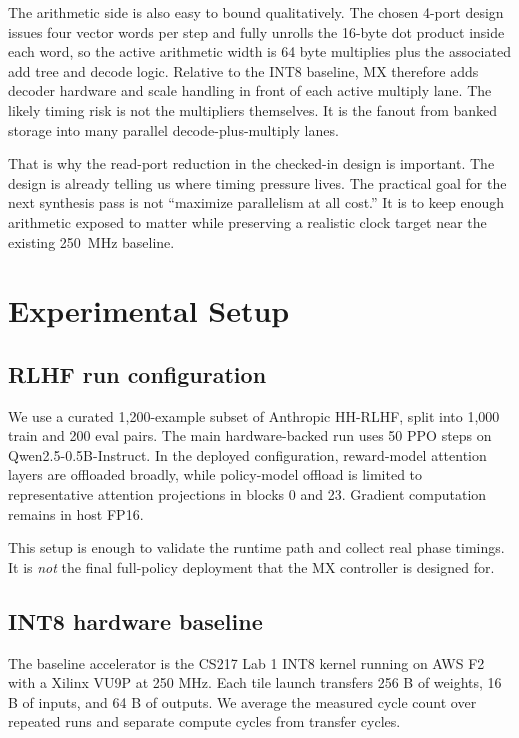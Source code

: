 \documentclass[11pt,a4paper]{article}
\begin{document}
The arithmetic side is also easy to bound qualitatively. The chosen 4-port design issues four vector words per step and fully unrolls the 16-byte dot product inside each word, so the active arithmetic width is 64 byte multiplies plus the associated add tree and decode logic. Relative to the INT8 baseline, MX therefore adds decoder hardware and scale handling in front of each active multiply lane. The likely timing risk is not the multipliers themselves. It is the fanout from banked storage into many parallel decode-plus-multiply lanes.

That is why the read-port reduction in the checked-in design is important. The design is already telling us where timing pressure lives. The practical goal for the next synthesis pass is not ``maximize parallelism at all cost.'' It is to keep enough arithmetic exposed to matter while preserving a realistic clock target near the existing 250~MHz baseline.


\section{Experimental Setup}

\subsection{RLHF run configuration}

We use a curated 1,200-example subset of Anthropic HH-RLHF, split into 1,000 train and 200 eval pairs. The main hardware-backed run uses 50 PPO steps on Qwen2.5-0.5B-Instruct. In the deployed configuration, reward-model attention layers are offloaded broadly, while policy-model offload is limited to representative attention projections in blocks 0 and 23. Gradient computation remains in host FP16.

This setup is enough to validate the runtime path and collect real phase timings. It is \emph{not} the final full-policy deployment that the MX controller is designed for.

\subsection{INT8 hardware baseline}

The baseline accelerator is the CS217 Lab 1 INT8 kernel running on AWS F2 with a Xilinx VU9P at 250 MHz. Each tile launch transfers 256 B of weights, 16 B of inputs, and 64 B of outputs. We average the measured cycle count over repeated runs and separate compute cycles from transfer cycles.
\end{document}
